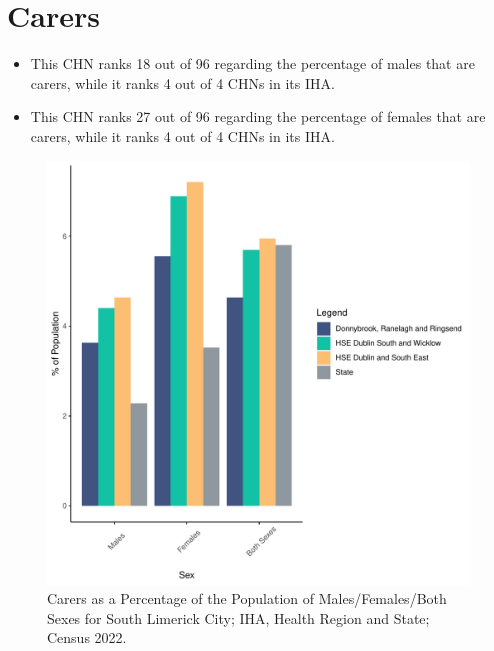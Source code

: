 \documentclass{article}
\begin{document}
\section{Carers}\label{sect:Carers}
\begin{itemize}
\item This CHN ranks  18 out of 96 regarding the percentage of males that are carers, while it ranks   4 out of 4 CHNs in its IHA.
\item This CHN ranks  27 out of 96 regarding the percentage of females that are carers, while it ranks   4 out of 4 CHNs in its IHA.
\end{itemize}
\begin{figure}[H]
	\centering
	\includegraphics[width = 150mm]{../figures/CareED.pdf}
	\caption{Carers as a Percentage of the Population of Males/Females/Both Sexes for South Limerick City; IHA, Health Region and State; Census 2022.}
	\label{fig:2ae19629-1a6a-13a3-e055-000000000001}
	\end{figure}
\end{document}
